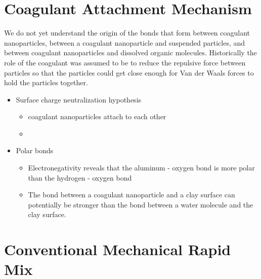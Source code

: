 \documentclass[letterpaper,10pt,english]{sphinxmanual}
\begin{document}
\section{Coagulant Attachment Mechanism}
\label{\detokenize{Rapid_Mix/RM_Theory_and_Future_Work:coagulant-attachment-mechanism}}\label{\detokenize{Rapid_Mix/RM_Theory_and_Future_Work:heading-coagulant-attachment-mechanism}}
We do not yet understand the origin of the bonds that form between coagulant nanoparticles, between a coagulant nanoparticle and suspended particles, and between coagulant nanoparticles and dissolved organic molecules. Historically the role of the coagulant was assumed to be to reduce the repulsive force between particles so that the particles could get close enough for Van der Waals forces to hold the particles together.
\begin{itemize}
\item {} 
Surface charge neutralization hypothesis
\begin{itemize}
\item {} 
coagulant nanoparticles attach to each other

\item {} 
\end{itemize}

\item {} 
Polar bonds
\begin{itemize}
\item {} 
Electronegativity reveals that the aluminum - oxygen bond is more polar than the hydrogen - oxygen bond

\item {} 
The bond between a coagulant nanoparticle and a clay surface can potentially be stronger than the bond between a water molecule and the clay surface.

\end{itemize}

\end{itemize}


\section{Conventional Mechanical Rapid Mix}
\label{\detokenize{Rapid_Mix/RM_Theory_and_Future_Work:conventional-mechanical-rapid-mix}}\label{\detokenize{Rapid_Mix/RM_Theory_and_Future_Work:heading-conventional-mechanical-rapid-mix}}
\end{document}
